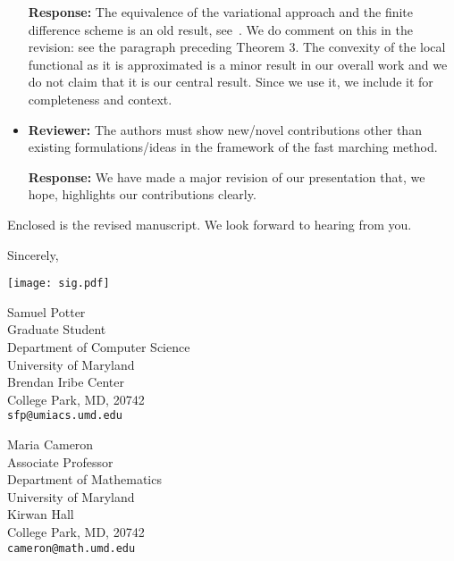 \documentclass{article}
\begin{document}
\begin{itemize}
  \textbf{Response:} The equivalence of the variational approach and
  the finite difference scheme is an old result,
  see~\cite{sethian1999level}. We do comment on this in the revision:
  see the paragraph preceding Theorem 3. The convexity of the local
  functional as it is approximated is a minor result in our overall
  work and we do not claim that it is our central result. Since we use
  it, we include it for completeness and context.

\item \textbf{Reviewer:} The authors must show new/novel contributions
  other than existing formulations/ideas in the framework of the fast
  marching method.

  \textbf{Response:} We have made a major revision of our presentation
  that, we hope, highlights our contributions clearly.

\end{itemize}

\vspace{2em}

Enclosed is the revised manuscript. We look forward to hearing from you.

\vspace{1em}

Sincerely,

\begin{minipage}{.5\linewidth}
  \texttt{[image: sig.pdf]}
\end{minipage}%
\begin{minipage}{.5\linewidth}
\end{minipage}


\begin{minipage}[t]{.5\linewidth}
  Samuel Potter \\
  Graduate Student \\
  Department of Computer Science \\
  University of Maryland \\
  Brendan Iribe Center \\
  College Park, MD, 20742 \\
  \texttt{sfp@umiacs.umd.edu}
\end{minipage}%
\begin{minipage}[t]{.5\linewidth}
  Maria Cameron \\
  Associate Professor \\
  Department of Mathematics \\
  University of Maryland \\
  Kirwan Hall \\
  College Park, MD, 20742 \\
  \texttt{cameron@math.umd.edu}
\end{minipage}


{}
\end{document}
